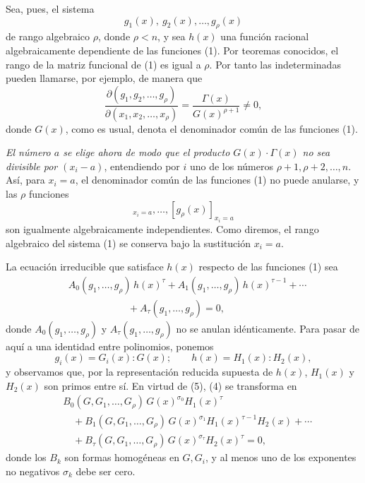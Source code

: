 \documentclass[11pt]{article}
\begin{document}
Sea, pues, el sistema
\begin{equation}
  g_1(x),\ g_2(x),\ldots,g_\rho(x)
\tag{1}
\end{equation}
de rango algebraico $\rho$, donde $\rho<n$, y sea $h(x)$ una función racional algebraicamente dependiente de las funciones (1). Por teoremas conocidos, el rango de la matriz funcional de (1) es igual a $\rho$. Por tanto las indeterminadas pueden llamarse, por ejemplo, de manera que
\begin{equation}
 \frac{\partial(g_1,g_2,\ldots,g_\rho)}{\partial(x_1,x_2,\ldots,x_\rho)}
 =\frac{\Gamma(x)}{G(x)^{\rho+1}}\ne0,
\tag{2}
\end{equation}
donde $G(x)$, como es usual, denota el denominador común de las funciones (1).

\emph{El número $a$ se elige ahora de modo que el producto $G(x)\cdot\Gamma(x)$ no sea divisible por $(x_i-a)$}, entendiendo por $i$ uno de los números $\rho+1,\rho+2,\ldots,n$. Así, para $x_i=a$, el denominador común de las funciones (1) no puede anularse, y las $\rho$ funciones
\begin{equation}
  [g_1(x)]_{x_i=a},\ldots,[g_\rho(x)]_{x_i=a}
\tag{3}
\end{equation}
son igualmente algebraicamente independientes. Como diremos, el rango algebraico del sistema (1) se conserva bajo la sustitución $x_i=a$.

La ecuación irreducible que satisface $h(x)$ respecto de las funciones (1) sea
\begin{equation}
\begin{aligned}
&A_0(g_1,\ldots,g_\rho)\,h(x)^\tau
 +A_1(g_1,\ldots,g_\rho)\,h(x)^{\tau-1}
 +\cdots \\
&\hspace{6em}+A_\tau(g_1,\ldots,g_\rho)=0,
\end{aligned}
\tag{4}
\end{equation}
donde $A_0(g_1,\ldots,g_\rho)$ y $A_\tau(g_1,\ldots,g_\rho)$ no se anulan idénticamente. Para pasar de aquí a una identidad entre polinomios, ponemos
\begin{equation}
  g_i(x)=G_i(x):G(x);\qquad h(x)=H_1(x):H_2(x),
\tag{5}
\end{equation}
y observamos que, por la representación reducida supuesta de $h(x)$, $H_1(x)$ y $H_2(x)$ son primos entre sí. En virtud de (5), (4) se transforma en
\begin{equation}
\begin{aligned}
&B_0(G,G_1,\ldots,G_\rho)\,G(x)^{\sigma_0}H_1(x)^\tau \\
&\quad+B_1(G,G_1,\ldots,G_\rho)\,G(x)^{\sigma_1}H_1(x)^{\tau-1}H_2(x)+\cdots \\
&\quad+B_\tau(G,G_1,\ldots,G_\rho)\,G(x)^{\sigma_\tau}H_2(x)^\tau=0,
\end{aligned}
\tag{6}
\end{equation}
donde los $B_k$ son formas homogéneas en $G,G_i$, y al menos uno de los exponentes no negativos $\sigma_k$ debe ser cero.
\end{document}
